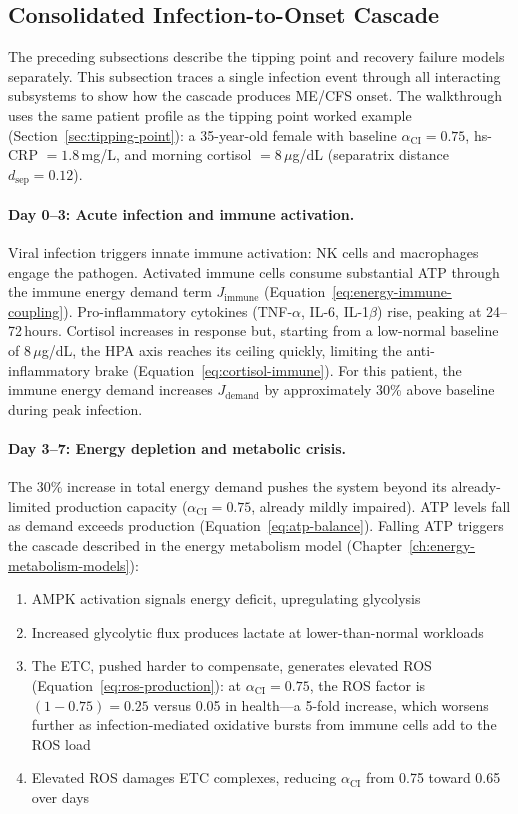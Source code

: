 \subsection{Consolidated Infection-to-Onset Cascade}
\label{sec:infection-cascade}

The preceding subsections describe the tipping point and recovery failure models separately. This subsection traces a single infection event through all interacting subsystems to show how the cascade produces ME/CFS onset. The walkthrough uses the same patient profile as the tipping point worked example (Section~\ref{sec:tipping-point}): a 35-year-old female with baseline $\alpha_{\text{CI}} = 0.75$, hs-CRP $= 1.8$\,mg/L, and morning cortisol $= 8$\,$\mu$g/dL (separatrix distance $d_{\text{sep}} = 0.12$).

\paragraph{Day 0--3: Acute infection and immune activation.}
Viral infection triggers innate immune activation: NK cells and macrophages engage the pathogen. Activated immune cells consume substantial ATP through the immune energy demand term $J_{\text{immune}}$ (Equation~\ref{eq:energy-immune-coupling}). Pro-inflammatory cytokines (TNF-$\alpha$, IL-6, IL-1$\beta$) rise, peaking at 24--72\,hours. Cortisol increases in response but, starting from a low-normal baseline of $8$\,$\mu$g/dL, the HPA axis reaches its ceiling quickly, limiting the anti-inflammatory brake (Equation~\ref{eq:cortisol-immune}). For this patient, the immune energy demand increases $J_{\text{demand}}$ by approximately 30\% above baseline during peak infection.

\paragraph{Day 3--7: Energy depletion and metabolic crisis.}
The 30\% increase in total energy demand pushes the system beyond its already-limited production capacity ($\alpha_{\text{CI}} = 0.75$, already mildly impaired). ATP levels fall as demand exceeds production (Equation~\ref{eq:atp-balance}). Falling ATP triggers the cascade described in the energy metabolism model (Chapter~\ref{ch:energy-metabolism-models}):
\begin{enumerate}
    \item AMPK activation signals energy deficit, upregulating glycolysis
    \item Increased glycolytic flux produces lactate at lower-than-normal workloads
    \item The ETC, pushed harder to compensate, generates elevated ROS (Equation~\ref{eq:ros-production}): at $\alpha_{\text{CI}} = 0.75$, the ROS factor is $(1 - 0.75) = 0.25$ versus 0.05 in health---a 5-fold increase, which worsens further as infection-mediated oxidative bursts from immune cells add to the ROS load
    \item Elevated ROS damages ETC complexes, reducing $\alpha_{\text{CI}}$ from 0.75 toward 0.65 over days
\end{enumerate}

